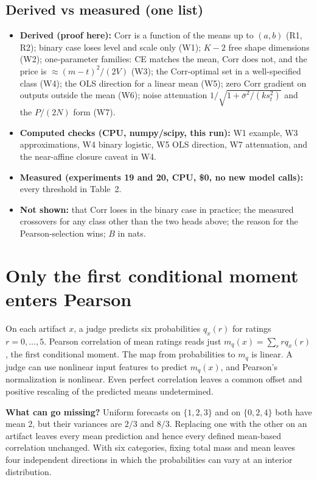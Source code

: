 \documentclass[11pt]{article}
\begin{document}
\subsection*{Derived vs measured (one list)}
\begin{itemize}
\item \textbf{Derived (proof here):} Corr is a function of the means up to $(a,b)$ (R1, R2); binary case loses level and scale only (W1); $K-2$ free shape dimensions (W2); one-parameter families: CE matches the mean, Corr does not, and the price is $\approx(m-t)^2/(2V)$ (W3); the Corr-optimal set in a well-specified class (W4); the OLS direction for a linear mean (W5); zero Corr gradient on outputs outside the mean (W6); noise attenuation $1/\sqrt{1+\bar\sigma^2/(ks_t^2)}$ and the $P/(2N)$ form (W7).
\item \textbf{Computed checks (CPU, numpy/scipy, this run):} W1 example, W3 approximations, W4 binary logistic, W5 OLS direction, W7 attenuation, and the near-affine closure caveat in W4.
\item \textbf{Measured (experiments 19 and 20, CPU, \$0, no new model calls):} every threshold in Table~2.
\item \textbf{Not shown:} that Corr loses in the binary case in practice; the measured crossovers for any class other than the two heads above; the reason for the Pearson-selection wins; $B$ in nats.
\end{itemize}

\section*{Only the first conditional moment enters Pearson}
On each artifact $x$, a judge predicts six probabilities $q_x(r)$ for ratings $r=0,\ldots,5$.
Pearson correlation of mean ratings reads just $m_q(x)=\sum_r r q_x(r)$, the first conditional
moment. The map from probabilities to $m_q$ is linear. A judge can use nonlinear input features
to predict $m_q(x)$, and Pearson's normalization is nonlinear.
Even perfect correlation leaves a common offset and positive rescaling of the predicted means undetermined.

\textbf{What can go missing?} Uniform forecasts on $\{1,2,3\}$ and on $\{0,2,4\}$ both
have mean 2, but their variances are $2/3$ and $8/3$. Replacing one with the other on an artifact leaves
every mean prediction and hence every defined mean-based correlation unchanged.
With six categories, fixing total mass and mean leaves four independent directions in which the probabilities can vary at an interior distribution.
\end{document}
